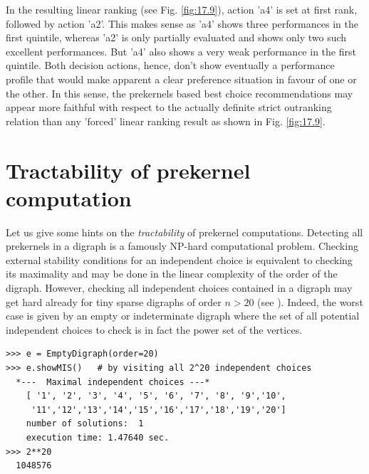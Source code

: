 In the resulting linear ranking (see Fig. \ref{fig:17.9}), action 'a4' is set at first rank, followed by action 'a2'. This makes sense as 'a4' shows three performances in the first quintile, whereas 'a2' is only partially evaluated and shows only two such excellent performances. But 'a4' also shows a very weak performance in the first quintile. Both decision actions, hence, don't show eventually a performance profile that would make apparent a clear preference situation in favour of one or the other. In this sense, the prekernels based best choice recommendations may appear more faithful with respect to the actually definite strict outranking relation than any 'forced' linear ranking result as shown in Fig. \ref{fig:17.9}.

\section{Tractability of prekernel computation}
\label{sec:17.5}

Let us give some hints on the \emph{tractability} of prekernel computations. Detecting all prekernels in a digraph is a famously NP-hard computational problem. Checking external stability conditions for an independent choice is equivalent to checking its maximality and may be done in the linear complexity of the order of the digraph. However, checking all independent choices contained in a digraph may get hard already for tiny sparse digraphs of order $n > 20$ (see \citep{BIS-2006b}). Indeed, the worst case is given by an empty or indeterminate digraph where the set of all potential independent choices to check is in fact the power set of the vertices.
\begin{lstlisting}
>>> e = EmptyDigraph(order=20)
>>> e.showMIS()   # by visiting all 2^20 independent choices
  *---  Maximal independent choices ---*
    [ '1', '2', '3', '4', '5', '6', '7', '8', '9','10',
     '11','12','13','14','15','16','17','18','19','20']
    number of solutions:  1
    execution time: 1.47640 sec.
>>> 2**20
  1048576
\end{lstlisting}

